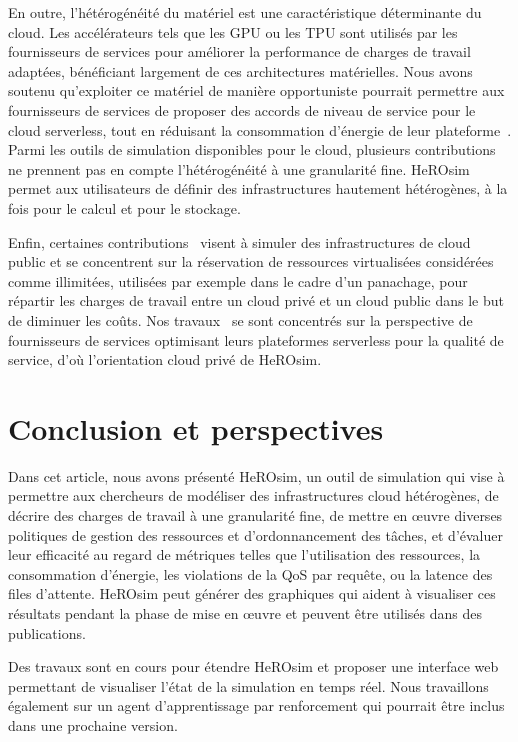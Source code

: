 En outre, l'hétérogénéité du matériel est une caractéristique déterminante du cloud. Les accélérateurs tels que les \gls{GPU} ou les \gls{TPU} sont utilisés par les fournisseurs de services pour améliorer la performance de charges de travail adaptées, bénéficiant largement de ces architectures matérielles. Nous avons soutenu qu'exploiter ce matériel de manière opportuniste pourrait permettre aux fournisseurs de services de proposer des accords de niveau de service pour le cloud serverless, tout en réduisant la consommation d'énergie de leur plateforme~\cite{herofake}.
Parmi les outils de simulation disponibles pour le cloud, plusieurs contributions~\cite{jeonCloudSimExtensionSimulatingDistributed2019, cai_elasticsim_2017, nunez_icancloud_2012, mahmoudiSimFaaSPerformanceSimulator2021} ne prennent pas en compte l'hétérogénéité à une granularité fine. HeROsim permet aux utilisateurs de définir des infrastructures hautement hétérogènes, à la fois pour le calcul et pour le stockage.

Enfin, certaines contributions~\cite{nunez_icancloud_2012, mahmoudiSimFaaSPerformanceSimulator2021} visent à simuler des infrastructures de cloud public et se concentrent sur la réservation de ressources virtualisées considérées comme illimitées, utilisées par exemple dans le cadre d'un panachage, pour répartir les charges de travail entre un cloud privé et un cloud public dans le but de diminuer les coûts.
Nos travaux~\cite{herofake, herocache} se sont concentrés sur la perspective de fournisseurs de services optimisant leurs plateformes serverless pour la qualité de service, d'où l'orientation cloud privé de HeROsim.

\section{Conclusion et perspectives}
\label{section:herosim-conclusion}

Dans cet article, nous avons présenté HeROsim, un outil de simulation qui vise à permettre aux chercheurs de modéliser des infrastructures cloud hétérogènes, de décrire des charges de travail à une granularité fine, de mettre en œuvre diverses politiques de gestion des ressources et d'ordonnancement des tâches, et d'évaluer leur efficacité au regard de métriques telles que l'utilisation des ressources, la consommation d'énergie, les violations de la QoS par requête, ou la latence des files d'attente. HeROsim peut générer des graphiques qui aident à visualiser ces résultats pendant la phase de mise en œuvre et peuvent être utilisés dans des publications.

Des travaux sont en cours pour étendre HeROsim et proposer une interface web permettant de visualiser l'état de la simulation en temps réel. Nous travaillons également sur un agent d'apprentissage par renforcement qui pourrait être inclus dans une prochaine version.
